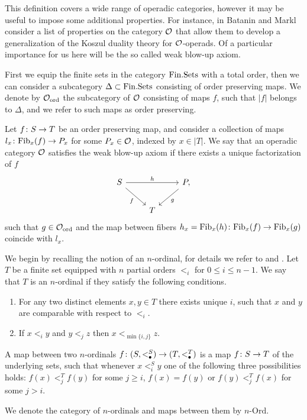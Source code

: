 \documentclass[letterpaper,12pt,leqno]{article}
\numberwithin{equation}{theorem}
\def\Fib{\mathrm{Fib}}
\def\Ord{\textrm{-}\mathrm{Ord}}
\def\ord{\mathrm{ord}}
\begin{document}
\begin{nparagraph}
This definition covers a wide range of operadic categories, however it may be useful to impose some additional properties. For instance, in \cite{Bat-Markl-3} Batanin and Markl consider a list of properties
on the category $\mathcal{O}$ that allow them to develop a generalization of the Koszul duality theory for $\mathcal{O}$-operads. Of a particular importance for us here will be the so called weak blow-up axiom.

First we equip the finite sets in the category $\mathrm{Fin.Sets}$ with a total order, then we can consider a subcategory $\Delta \subset \mathrm{Fin.Sets}$ consisting of order preserving maps. We denote by $\O_\ord$ the subcategory
of $\mathcal{O}$ consisting of maps $f$, such that $|f|$ belongs to $\Delta$, and we refer to such maps as order preserving.

Let $f\colon S \to T$ be an order preserving map, and consider a collection of maps $l_x\from \Fib_x (f) \to P_x$ for some $P_x \in \mathcal{O}$, indexed by $x \in |T|$.
We say that an operadic category $\mathcal{O}$ satisfies the weak blow-up axiom if there exists a unique factorization of $f$
$$
\begin{tikzcd}
S \ar[dr, "f"'] \ar[rr, "h"] && P, \ar[dl, "g"] \\
& T &
\end{tikzcd}
$$
such that $g \in \O_\ord$ and the map between fibers $h_x = \Fib_x(h)\from \Fib_x(f) \to \Fib_x(g)$ coincide with $l_x$.

\end{nparagraph}

\begin{nparagraph}
We begin by recalling the notion of an $n$-ordinal, for details we refer to \cite{Batanin-sym} and \cite{Bat-n-ordinal}. Let $T$ be a finite set equipped with $n$ partial orders $<_i$ for $0 \le i \le n-1$.
We say that $T$ is an $n$-ordinal if they satisfy the following conditions.
\begin{enumerate}[label=\alph*)]
\item For any two distinct elements $x, y \in T$ there exists unique $i$, such that $x$ and $y$ are comparable with respect to $<_i$.
\item If $x <_i y$ and $y <_j z$ then $x <_{\min\{i, j\}} z$.
\end{enumerate}

A map between two $n$-ordinals $f\colon (S, <^S_\bullet) \to (T, <^T_\bullet)$ is a map $f\colon S \to T$ of the underlying sets, such that whenever $x <^S_i y$ one of the following three possibilities holds:
$f(x) <^T_j f(y)$ for some $j \ge i$, $f(x) = f(y)$ or $f(y) <^T_j f(x)$ for some $j > i$.

We denote the category of $n$-ordinals and maps between them by $n\Ord$.
\end{nparagraph}
\end{document}

